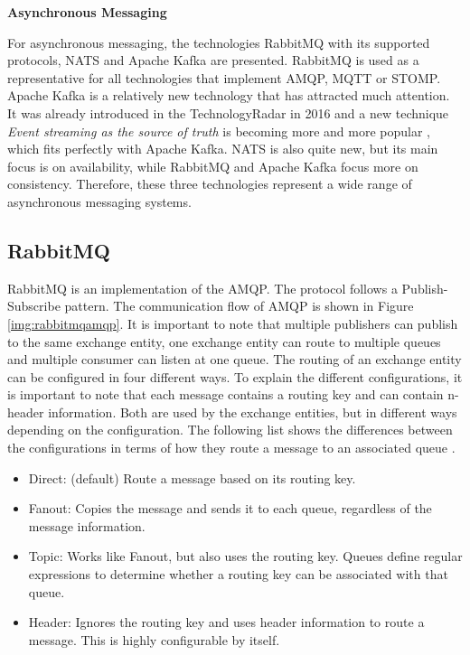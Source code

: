 
\textbf{Asynchronous Messaging}

For asynchronous messaging, the technologies RabbitMQ with its supported protocols, \ac{NATS} and Apache Kafka are presented.
RabbitMQ is used as a representative for all technologies that implement \acf{AMQP}, \acf{MQTT} or \acf{STOMP}.
Apache Kafka is a relatively new technology that has attracted much attention.
It was already introduced in the TechnologyRadar in 2016 \cite{ThoughtWorks.01.06.2020} and a new technique \textit{Event streaming as the source of truth} is becoming more and more popular \cite{ThoughtWorks.01.06.2020b}, which fits perfectly with Apache Kafka.
\ac{NATS} is also quite new, but its main focus is on availability, while RabbitMQ and Apache Kafka focus more on consistency.
Therefore, these three technologies represent a wide range of asynchronous messaging systems.

\subsection{RabbitMQ}\label{cha:Technologies:communication:rabbitmq}

RabbitMQ is an implementation of the \acf{AMQP}.
The protocol follows a Publish-Subscribe pattern.
The communication flow of \ac{AMQP} is shown in Figure \ref{img:rabbitmqamqp}.
It is important to note that multiple publishers can publish to the same exchange entity, one exchange entity can route to multiple queues and multiple consumer can listen at one queue.
The routing of an exchange entity can be configured in four different ways.
To explain the different configurations, it is important to note that each message contains a routing key and can contain n-header information.
Both are used by the exchange entities, but in different ways depending on the configuration.
The following list shows the differences between the configurations in terms of how they route a message to an associated queue \cite{RabbitMQ.2020}\cite[p.~26ff.]{SanjayAiyagarietal.2008}.

\begin{itemize}
	\item Direct: (default) Route a message based on its routing key.
	\item Fanout: Copies the message and sends it to each queue, regardless of the message information.
	\item Topic: Works like Fanout, but also uses the routing key. Queues define regular expressions to determine whether a routing key can be associated with that queue.
	\item Header: Ignores the routing key and uses header information to route a message. This is highly configurable by itself.
\end{itemize}

